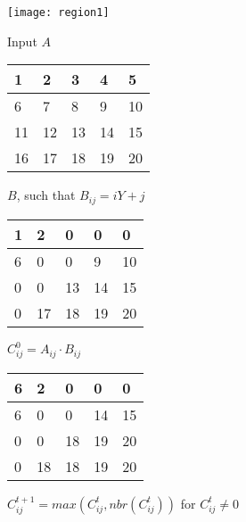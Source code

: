 \documentclass[../main.tex]{subfiles}
\begin{document}
    \begin{figure}[H]
      \centering
      \begin{subfigure}[b]{0.45\textwidth}
        \centering
        \texttt{[image: region1]}
        \caption{Input $A$}
      \end{subfigure}
      \begin{subfigure}[b]{0.45\textwidth}
        \centering
        \begin{tabular}{|p{1em}|p{1em}|p{1em}|p{1em}|p{1em}|}
          \hline
          1&2&3&4&5\\ \hline
          6&7&8&9&10\\ \hline
          11&12&13&14&15\\ \hline
          16&17&18&19&20\\  \hline
        \end{tabular}
        \caption{$B$, such that $B_{ij}=iY+j$}
      \end{subfigure}
      \begin{subfigure}[b]{0.45\textwidth}
        \centering
        \begin{tabular}{|p{1em}|p{1em}|p{1em}|p{1em}|p{1em}|}
          \hline
          1&2&0&0&0\\ \hline
          6&0&0&9&10\\ \hline
          0&0&13&14&15\\ \hline
          0&17&18&19&20\\  \hline
        \end{tabular}
        \caption{ $C^0_{ij}=A_{ij}\cdot B_{ij}$}
      \end{subfigure}
      \begin{subfigure}[b]{0.45\textwidth}
        \centering
        \begin{tabular}{|p{1em}|p{1em}|p{1em}|p{1em}|p{1em}|}
          \hline
          6&2&0&0&0\\ \hline
          6&0&0&14&15\\ \hline
          0&0&18&19&20\\ \hline
          0&18&18&19&20\\  \hline
        \end{tabular}
        \caption{$C^{t+1}_{ij}=max\left(C^t_{ij},nbr(C^t_{ij})\right)$ for $C^t_{ij} \neq 0$}
      \end{subfigure}
      \begin{subfigure}[b]{0.45\textwidth}
        \centering
        \begin{tabular}{|p{1em}|p{1em}|p{1em}|p{1em}|p{1em}|}

\end{tabular}
\end{subfigure}
\end{figure}
\end{document}
